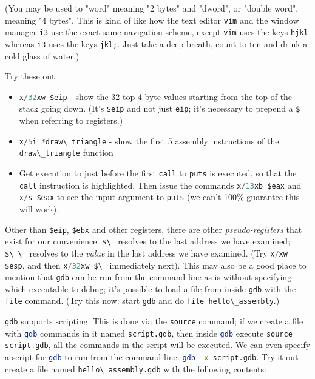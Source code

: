 \documentclass{article}
\newcommand{\xcode}[2]{\colorbox{ubuntuback}{\lstinline[language=#1]|#2|}}
\newcommand{\asm}[1]{\xcode{{[x86masm]assembler}}{#1}}
\newcommand{\code}[1]{\colorbox{ubuntuback}{\texttt{#1}}}
\newcommand{\gdb}[1]{\xcode{C}{#1}}
\begin{document}
(You may be used to "word" meaning "2 bytes" and "dword", or "double word", meaning "4 bytes". This is kind of like how the text editor \xcode{bash}{vim} and the window manager \xcode{bash}{i3} use the exact same navigation scheme, except \xcode{bash}{vim} uses the keys \code{hjkl} whereas \xcode{bash}{i3} uses the keys \code{jkl;}. Just take a deep breath, count to ten and drink a cold glass of water.) 

Try these out: 
\begin{itemize}
    \item \gdb{x/32xw $eip} - show the 32 top 4-byte values starting from the top of the stack going down. (It's \gdb{$eip} and not just \gdb{eip}; it's necessary to prepend a \gdb{$} when referring to registers.)
    \item \gdb{x/5i *draw\_triangle} - show the first 5 assembly instructions of the \gdb{draw\_triangle} function
    \item Get execution to just before the first \asm{call} to \xcode{C}{puts} is executed, so that the \asm{call} instruction is highlighted. Then issue the commands \gdb{x/13xb $eax} and \gdb{x/s $eax} to see the input argument to \gdb{puts} (we can't 100\% guarantee this will work).
\end{itemize}

Other than \gdb{$eip}, \gdb{$ebx} and other registers, there are other \textit{pseudo-registers} that exist for our convenience. \gdb{$\_} resolves to the last address we have examined; \gdb{$\_\_} resolves to the \textit{value} in the last address we have examined. (Try \gdb{x/xw $esp}, and then \gdb{x/32xw $\_} immediately next). This may also be a good place to mention that \gdb{gdb} can be run from the command line as-is without specifying which executable to debug; it's possible to load a file from inside \gdb{gdb} with the \gdb{file} command. (Try this now: start \gdb{gdb} and do \gdb{file hello\_assembly}.)

\gdb{gdb} supports scripting. This is done via the \gdb{source} command; if we create a file with \xcode{bash}{gdb} commands in it named \code{script.gdb}, then inside \xcode{bash}{gdb} execute \gdb{source script.gdb}, all the commands in the script will be executed. We can even specify a script for \xcode{bash}{gdb} to run from the command line: \xcode{bash}{gdb -x script.gdb}. Try it out -- create a file named \xcode{bash}{hello\_assembly.gdb} with the following contents:


\end{document}
